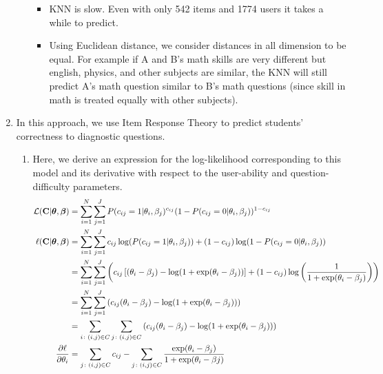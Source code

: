 \documentclass{article}
\newcommand{\bs}{\boldsymbol}
\newcommand{\mbf}[1]{\mathbf{#1}}
\newcommand{\mc}[1]{\mathcal{#1}}
\begin{document}
\begin{enumerate}[label=\arabic*.]
\begin{enumerate}[label=(\alph*)]
                \begin{itemize}
                    \item KNN is slow. Even with only 542 items and 1774 users it takes a while to predict.
                    \item Using Euclidean distance, we consider distances in all dimension to be equal. For example if A and B's math skills are very different but english, physics, and other subjects are similar, the KNN will still predict A's math question similar to B's math questions (since skill in math is treated equally with other subjects).
                \end{itemize}

        \end{enumerate}
        
    \item In this approach, we use Item Response Theory to predict students' correctness to diagnostic questions.
        \begin{enumerate}[label=(\alph*)]
            \item Here, we derive an expression for the log-likelihood corresponding to this model and its derivative with respect to the user-ability and question-difficulty parameters. 
                \begin{align*}
                    \mc L(\mbf C|\bs\theta,\bs\beta) &= \sum_{i=1}^{N}{\sum_{j=1}^{J}{P(c_{ij}=1|\theta_i,\beta_j)^{c_{ij}}(1-P(c_{ij}=0|\theta_i,\beta_j))^{1-c_{ij}}}} \\
                    \ell(\mbf C|\bs\theta, \bs\beta) &= \sum_{i=1}^{N}{\sum_{j=1}^{J}{c_{ij}\log(P(c_{ij}=1|\theta_i,\beta_j))+(1-c_{ij})\log(1-P(c_{ij}=0|\theta_i,\beta_j))}} \\
                                                     &= \sum_{i=1}^{N}{\sum_{j=1}^{J}{\left(c_{ij}\left[(\theta_i-\beta_j)-\log(1+\exp(\theta_i-\beta_j))\right]+(1-c_{ij})\log \left(\frac{1}{1+\exp(\theta_i-\beta_j)}\right)\right)}} \\
                                                     &= \sum_{i=1}^{N}{\sum_{j=1}^{J}{\left(c_{ij}(\theta_i-\beta_j)-\log(1+\exp(\theta_i-\beta_j))\right)}} \\
                                                     &= \sum_{i\colon (i, j)\in C}{\sum_{j\colon (i, j)\in C}{\left(c_{ij}(\theta_i-\beta_j)-\log(1+\exp(\theta_i-\beta_j))\right)}} \\
                    \pdv{\ell}{\theta_i} &= \sum_{j\colon (i, j)\in C}{c_{ij}}-\sum_{j\colon (i, j)\in C}{\frac{\exp(\theta_i-\beta_j)}{1+\exp(\theta_i-\beta j)}} \\

\end{align*}
\end{enumerate}
\end{enumerate}
\end{document}
